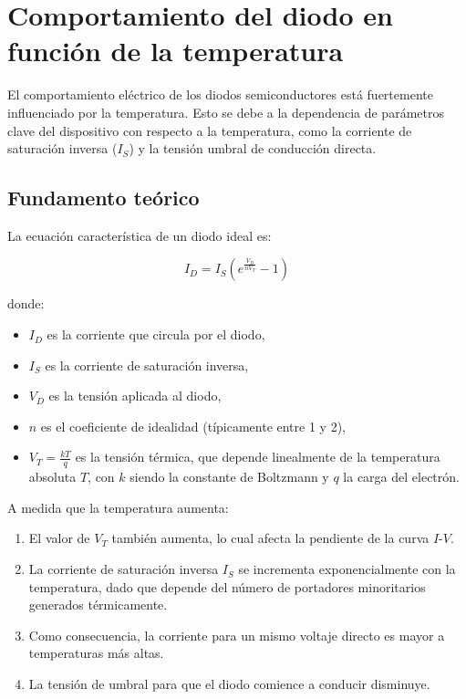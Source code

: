 \documentclass[chaptersright]{informeutn}
\begin{document}
\chapter{Comportamiento del diodo en función de la temperatura}

  El comportamiento eléctrico de los diodos semiconductores está fuertemente influenciado por la temperatura. Esto se
  debe a la dependencia de parámetros clave del dispositivo con respecto a la temperatura, como la corriente de saturación 
  inversa (\(I_S\)) y la tensión umbral de conducción directa.
  
  \section{Fundamento teórico}
  
    La ecuación característica de un diodo ideal es:
    
    \[
    I_D = I_S \left( e^{\frac{V_D}{n V_T}} - 1 \right)
    \]
    
    donde:
    \begin{itemize}
        \item \(I_D\) es la corriente que circula por el diodo,
        \item \(I_S\) es la corriente de saturación inversa,
        \item \(V_D\) es la tensión aplicada al diodo,
        \item \(n\) es el coeficiente de idealidad (típicamente entre 1 y 2),
        \item \(V_T = \frac{kT}{q}\) es la tensión térmica, que depende linealmente de la temperatura absoluta \(T\), con
            \(k\) siendo la constante de Boltzmann y \(q\) la carga del electrón.
    \end{itemize}
    
    A medida que la temperatura aumenta:
    \begin{enumerate}
        \item El valor de \(V_T\) también aumenta, lo cual afecta la pendiente de la curva \(I\)-\(V\).
        \item La corriente de saturación inversa \(I_S\) se incrementa exponencialmente con la temperatura, dado que 
            depende del número de portadores minoritarios generados térmicamente.
        \item Como consecuencia, la corriente para un mismo voltaje directo es mayor a temperaturas más altas.
        \item La tensión de umbral para que el diodo comience a conducir disminuye.
    \end{enumerate}
  
\end{document}
